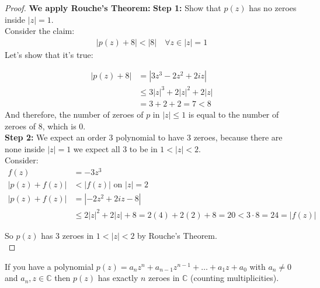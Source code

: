 \begin{proof}
    \textbf{We apply Rouche's Theorem:}
    \textbf{Step 1:} Show that $p(z)$ has no zeroes inside $|z| = 1$.\\
    Consider the claim:
    \begin{align*}
        |p(z) + 8| < |8| \quad \forall z \in |z| = 1
    \end{align*}
    Let's show that it's true:

    \begin{align*}
        |p(z) + 8| & = |3z^3 - 2z^2 + 2iz|       \\
                   & \leq 3|z|^3 + 2|z|^2 + 2|z| \\
                   & = 3 + 2 + 2 = 7 < 8
    \end{align*}
    And therefore, the number of zeroes of $p$ in $|z| \leq 1$ is equal to the number of zeroes of 8, which is 0.\\
    \textbf{Step 2:} We expect an order 3 polynomial to have 3 zeroes, because there are none inside $|z| = 1$ we expect all 3 to be in $1 < |z| < 2$.\\

    Consider:
    \begin{align*}
        f(z)          & = -3z^3                                                                 \\
        |p(z) + f(z)| & < |f(z)| \text{ on } |z| = 2                                            \\
        |p(z) + f(z)| & = |-2z^2 + 2iz - 8|                                                     \\
                      & \leq 2|z|^2 + 2|z| + 8 = 2(4) + 2(2) + 8 = 20 < 3 \cdot 8 = 24 = |f(z)|
    \end{align*}

    So $p(z)$ has 3 zeroes in $1 < |z| < 2$ by Rouche's Theorem.\\
\end{proof}

\begin{theorem}
    If you have a polynomial $p(z) = a_n z^n + a_{n-1} z^{n-1} + \ldots + a_1 z + a_0$ with $a_n \neq 0$ and $a_n, z \in \mathbb{C}$ then $p(z)$ has exactly $n$ zeroes in $\mathbb{C}$ (counting multiplicities).
\end{theorem}

